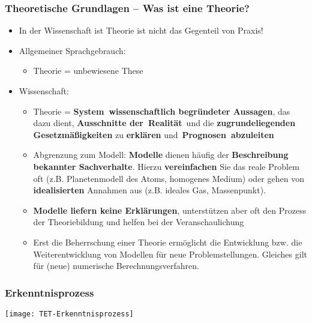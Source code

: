 \begin{frame}
  \frametitle{Theoretische Grundlagen -- Was ist eine Theorie?}
\begin{itemize}[<+->]
\item In der Wissenschaft ist Theorie ist nicht das Gegenteil von Praxis!
\item Allgemeiner Sprachgebrauch:
\begin{itemize}[<+->]
\item Theorie = unbewiesene These
\end{itemize}
\item Wissenschaft:
\begin{itemize}[<+->]
\item Theorie = \textbf{System wissenschaftlich begründeter Aussagen}, das dazu dient, \textbf{Ausschnitte der Realität} und die\textbf{ zugrundeliegenden Gesetzmäßigkeiten} zu \textbf{erklären} und \textbf{Prognosen abzuleiten}
  
\item Abgrenzung zum Modell: \textbf{Modelle} dienen häufig der \textbf{Beschreibung bekannter Sachverhalte}. Hierzu \textbf{vereinfachen} Sie das reale Problem oft (z.B. Planetenmodell des Atoms, homogenes Medium) oder gehen von \textbf{idealisierten} Annahmen aus (z.B. ideales Gas, Massenpunkt).
  
\item \textbf{Modelle liefern keine Erklärungen}, unterstützen aber oft den Prozess der Theoriebildung und helfen bei der Veranschaulichung 

\item Erst die Beherrschung einer Theorie ermöglicht die Entwicklung bzw. die Weiterentwicklung von Modellen für neue Problemstellungen. Gleiches gilt für (neue) numerische Berechnungsverfahren.    

\end{itemize}
\end{itemize}
\end{frame}

\begin{frame}
  \frametitle{Erkenntnisprozess}
\centerline{\texttt{[image: TET-Erkenntnisprozess]}}

\end{frame}




